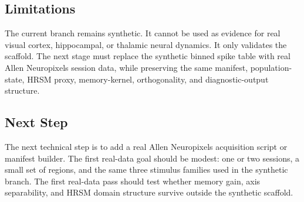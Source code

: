 \subsection{Limitations}

The current branch remains synthetic. It cannot be used as evidence for real visual cortex, hippocampal, or thalamic neural dynamics. It only validates the scaffold. The next stage must replace the synthetic binned spike table with real Allen Neuropixels session data, while preserving the same manifest, population-state, HRSM proxy, memory-kernel, orthogonality, and diagnostic-output structure.

\subsection{Next Step}

The next technical step is to add a real Allen Neuropixels acquisition script or manifest builder. The first real-data goal should be modest: one or two sessions, a small set of regions, and the same three stimulus families used in the synthetic branch. The first real-data pass should test whether memory gain, axis separability, and HRSM domain structure survive outside the synthetic scaffold.
